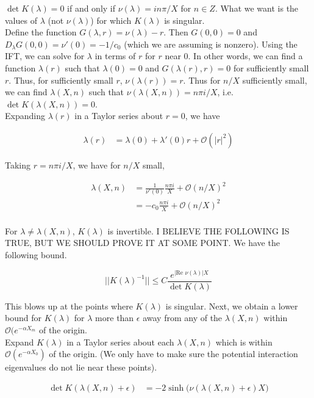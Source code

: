 \documentclass[12pt]{article}
\begin{document}
$\det K(\lambda) = 0$ if and only if $\nu(\lambda) = i n \pi/X$ for $n \in Z$. What we want is the values of $\lambda$ (not $\nu(\lambda)$) for which $K(\lambda)$ is singular. \\

Define the function $G(\lambda, r) = \nu(\lambda) - r$. Then $G(0, 0) = 0$ and $D_\lambda G(0, 0) = \nu'(0) = -1/c_0$ (which we are assuming is nonzero). Using the IFT, we can solve for $\lambda$ in terms of $r$ for $r$ near 0. In other words, we can find a function $\lambda(r)$ such that $\lambda(0) = 0$ and $G(\lambda(r), r) = 0$ for sufficiently small $r$. Thus, for sufficiently small $r$, $\nu(\lambda(r)) = r$. Thus for $n/X$ sufficiently small, we can find $\lambda(X, n)$ such that $\nu(\lambda(X, n)) = n \pi i / X$, i.e. $\det K(\lambda(X, n)) = 0$.\\

Expanding $\lambda(r)$ in a Taylor series about $r = 0$, we have

\begin{align*}
\lambda(r)
&= \lambda(0) + \lambda'(0) r + \mathcal{O}(|r|^2)
\end{align*}

Taking $r = n \pi i / X$, we have for $n/X$ small,

\begin{align*}
\lambda(X,n)
&= \frac{1}{\nu'(0)} \frac{n \pi i }{X} + \mathcal{O}(n/X)^2 \\
&= -c_0 \frac{n \pi i }{X} + \mathcal{O}(n/X)^2 \\
\end{align*} 

For $\lambda \neq \lambda(X,n)$, $K(\lambda)$ is invertible. I BELIEVE THE FOLLOWING IS TRUE, BUT WE SHOULD PROVE IT AT SOME POINT. We have the following bound.

\[
||K(\lambda)^{-1}|| \leq C \frac{e^{|\text{Re }\nu(\lambda)|X }}{\det K(\lambda)}
\]

This blows up at the points where $K(\lambda)$ is singular. Next, we obtain a lower bound for $K(\lambda)$ for $\lambda$ more than $\epsilon$ away from any of the $\lambda(X, n)$ within $\mathcal{O}(e^{-\alpha X_m}$ of the origin.\\

Expand $K(\lambda)$ in a Taylor series about each $\lambda(X, n)$ which is within $\mathcal{O}(e^{-\alpha X_0})$ of the origin. (We only have to make sure the potential interaction eigenvalues do not lie near these points).

\begin{align*}
\det K( \lambda(X, n) + \epsilon )
&= -2 \sinh \Big( \nu(\lambda(X, n) + \epsilon )X \Big) \\
\end{align*}
\end{document}
